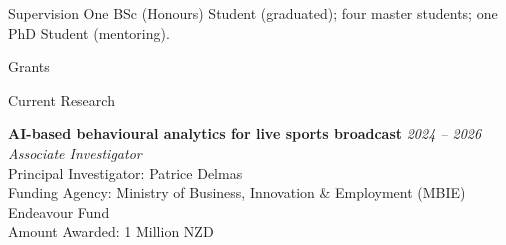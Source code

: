 \documentclass{resume} %
\begin{document}
\begin{rSection}{Supervision}
One BSc (Honours) Student (graduated); four master students; one PhD Student (mentoring).
\begin{comment}
	\begin{rSubsection}{BSc (Honours) Students}{}{}{}
		\item {\bf Yiwei Qi}\\ University of Auckland. \hfill {\em February 2022 -- November 2022} \\Topic: {\em Building A Game-Playing Agent Using Decision Theory}
	\end{rSubsection}
	\begin{rSubsection}{Master Students}{}{}{}
		\item {\bf Yitan Zhang, Hao Zhong, Junyi Yang, Shaiyu Chen}\\ University of Auckland. \hfill {\em September 2023 -- Present} \\Topic: {\em Reinforcement Learning in Large-scale Multi-agent Systems}
	\end{rSubsection}
	\begin{rSubsection}{Ph.D. Students}{}{}{}
		\item {\bf Libo Zhang (mentoring)}\\ University of Auckland \hfill {\em November 2021 -- Present} \\Topic: {\em Learning Correlated Equilibria in Multi-player Games}
	\end{rSubsection}
\end{comment}
\end{rSection}

\begin{rSection}{Grants}
	\begin{rSubsection}{Current Research}{}{}{}
		\item {\bf AI-based behavioural analytics for live sports broadcast} \hfill {\em 2024 -- 2026}\\
			{\em Associate Investigator}\\
			Principal Investigator: Patrice Delmas\\
			Funding Agency: Ministry of Business, Innovation \& Employment (MBIE) Endeavour Fund\\
			Amount Awarded: 1 Million NZD
	\end{rSubsection}
\end{rSection}
\end{document}
